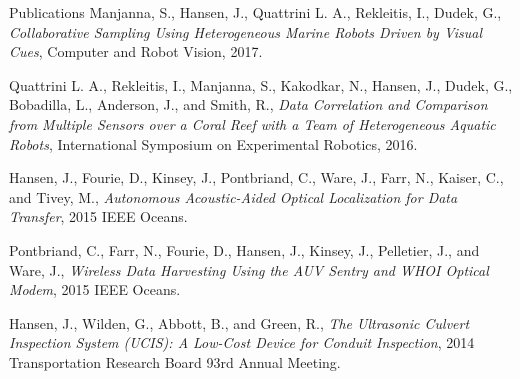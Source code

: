 \documentclass{resume} %
\begin{document}
\begin{rSection}{Publications}
Manjanna, S., Hansen, J., Quattrini L. A., Rekleitis, I., Dudek, G., 
\textit{Collaborative Sampling Using Heterogeneous Marine Robots Driven by Visual Cues}, Computer and Robot Vision, 2017. 
                
Quattrini L. A., Rekleitis, I., Manjanna, S., Kakodkar, N., Hansen, J.,   Dudek, G.,  Bobadilla, L.,  Anderson, J., and Smith, R.,
            \textit{Data Correlation and Comparison from Multiple Sensors over a Coral Reef with a Team of Heterogeneous Aquatic Robots},
             International Symposium on Experimental Robotics,
              2016.

Hansen, J., Fourie, D., Kinsey, J., Pontbriand, C., Ware, J., Farr, N., Kaiser, C., and Tivey, M., \textit{Autonomous Acoustic-Aided Optical Localization for Data Transfer}, 2015 IEEE Oceans.

Pontbriand, C., Farr, N., Fourie, D., Hansen, J.,  Kinsey, J., Pelletier, J., and Ware, J., 
 \textit{Wireless Data Harvesting Using the AUV Sentry and WHOI Optical Modem}, 2015 IEEE Oceans.

Hansen, J., Wilden, G., Abbott, B., and Green, R., \textit{The Ultrasonic Culvert
Inspection System (UCIS): A Low-Cost Device for Conduit Inspection}, 2014 Transportation
Research Board 93rd Annual Meeting. 
\end{rSection}
\end{document}
